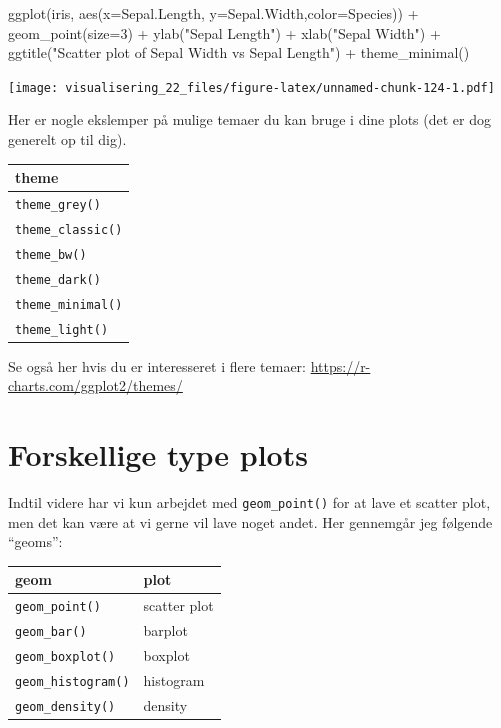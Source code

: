 \documentclass[
]{book}
\newenvironment{Shaded}{\begin{snugshade}}{\end{snugshade}}
\newcommand{\AttributeTok}[1]{\textcolor[rgb]{0.77,0.63,0.00}{#1}}
\newcommand{\DecValTok}[1]{\textcolor[rgb]{0.00,0.00,0.81}{#1}}
\newcommand{\FunctionTok}[1]{\textcolor[rgb]{0.00,0.00,0.00}{#1}}
\newcommand{\NormalTok}[1]{#1}
\newcommand{\SpecialCharTok}[1]{\textcolor[rgb]{0.00,0.00,0.00}{#1}}
\newcommand{\StringTok}[1]{\textcolor[rgb]{0.31,0.60,0.02}{#1}}
\begin{document}
\begin{Shaded}
\begin{Highlighting}[]
\FunctionTok{ggplot}\NormalTok{(iris, }\FunctionTok{aes}\NormalTok{(}\AttributeTok{x=}\NormalTok{Sepal.Length, }\AttributeTok{y=}\NormalTok{Sepal.Width,}\AttributeTok{color=}\NormalTok{Species)) }\SpecialCharTok{+}
  \FunctionTok{geom\_point}\NormalTok{(}\AttributeTok{size=}\DecValTok{3}\NormalTok{) }\SpecialCharTok{+}
  \FunctionTok{ylab}\NormalTok{(}\StringTok{"Sepal Length"}\NormalTok{) }\SpecialCharTok{+}
  \FunctionTok{xlab}\NormalTok{(}\StringTok{"Sepal Width"}\NormalTok{) }\SpecialCharTok{+}
  \FunctionTok{ggtitle}\NormalTok{(}\StringTok{"Scatter plot of Sepal Width vs Sepal Length"}\NormalTok{) }\SpecialCharTok{+}
  \FunctionTok{theme\_minimal}\NormalTok{()}
\end{Highlighting}
\end{Shaded}

\texttt{[image: visualisering\_22\_files/figure-latex/unnamed-chunk-124-1.pdf]}

Her er nogle ekslemper på mulige temaer du kan bruge i dine plots (det er dog generelt op til dig).

\begin{longtable}[]{@{}l@{}}
\toprule
theme \\
\midrule
\endhead
\texttt{theme\_grey()} \\
\texttt{theme\_classic()} \\
\texttt{theme\_bw()} \\
\texttt{theme\_dark()} \\
\texttt{theme\_minimal()} \\
\texttt{theme\_light()} \\
\bottomrule
\end{longtable}

Se også her hvis du er interesseret i flere temaer: \url{https://r-charts.com/ggplot2/themes/}

\hypertarget{forskellige-type-plots}{%
\section{Forskellige type plots}\label{forskellige-type-plots}}

Indtil videre har vi kun arbejdet med \texttt{geom\_point()} for at lave et scatter plot, men det kan være at vi gerne vil lave noget andet. Her gennemgår jeg følgende ``geoms'':

\begin{longtable}[]{@{}ll@{}}
\toprule
geom & plot \\
\midrule
\endhead
\texttt{geom\_point()} & scatter plot \\
\texttt{geom\_bar()} & barplot \\
\texttt{geom\_boxplot()} & boxplot \\
\texttt{geom\_histogram()} & histogram \\
\texttt{geom\_density()} & density \\
\bottomrule
\end{longtable}
\end{document}
